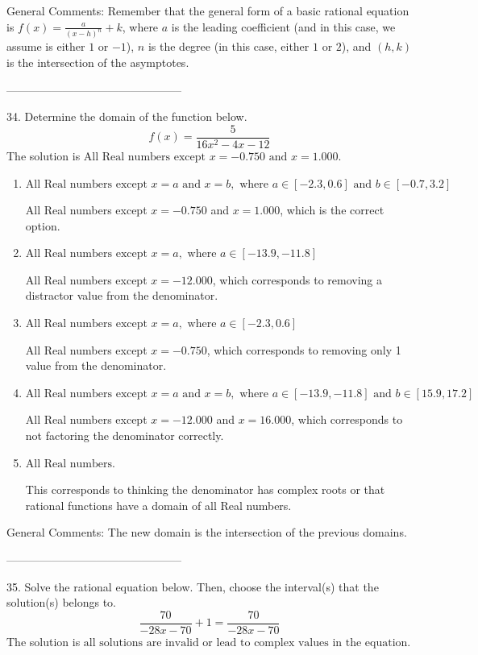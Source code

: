 \documentclass{article}[14pt]
\begin{document}
General Comments: Remember that the general form of a basic rational equation is $ f(x) = \frac{a}{(x-h)^n} + k$, where $a$ is the leading coefficient (and in this case, we assume is either $1$ or $-1$), $n$ is the degree (in this case, either $1$ or $2$), and $(h, k)$ is the intersection of the asymptotes.

-----------------------------------------------

34. Determine the domain of the function below.
$$ f(x) = \frac{5}{16x^{2} -4 x -12} $$ 
The solution is $ \text{All Real numbers except } x = -0.750 \text{ and } x = 1.000. $ 

\begin{enumerate}[label=\Alph*.] 
\item $ \text{All Real numbers except } x = a \text{ and } x = b, \text{ where } a \in [-2.3, 0.6] \text{ and } b \in [-0.7, 3.2] $ 

 All Real numbers except $x = -0.750$ and $x = 1.000$, which is the correct option. 
\item $ \text{All Real numbers except } x = a, \text{ where } a \in [-13.9, -11.8] $ 

 All Real numbers except $x = -12.000$, which corresponds to removing a distractor value from the denominator. 
\item $ \text{All Real numbers except } x = a, \text{ where } a \in [-2.3, 0.6] $ 

 All Real numbers except $x = -0.750$, which corresponds to removing only 1 value from the denominator. 
\item $ \text{All Real numbers except } x = a \text{ and } x = b, \text{ where } a \in [-13.9, -11.8] \text{ and } b \in [15.9, 17.2] $ 

 All Real numbers except $x = -12.000$ and $x = 16.000$, which corresponds to not factoring the denominator correctly. 
\item $ \text{All Real numbers.} $ 

 This corresponds to thinking the denominator has complex roots or that rational functions have a domain of all Real numbers. 
\end{enumerate} 
 
General Comments: The new domain is the intersection of the previous domains.

-----------------------------------------------

35. Solve the rational equation below. Then, choose the interval(s) that the solution(s) belongs to.
$$ \frac{70}{-28x -70} + 1 = \frac{70}{-28x -70} $$ 
The solution is $ \text{all solutions are invalid or lead to complex values in the equation.} $ 
\end{document}
